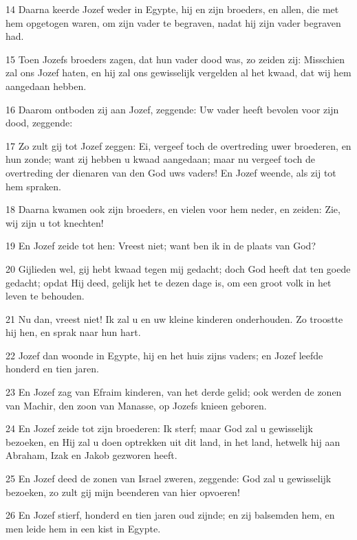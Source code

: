 \par 14 Daarna keerde Jozef weder in Egypte, hij en zijn broeders, en allen, die met hem opgetogen waren, om zijn vader te begraven, nadat hij zijn vader begraven had.
\par 15 Toen Jozefs broeders zagen, dat hun vader dood was, zo zeiden zij: Misschien zal ons Jozef haten, en hij zal ons gewisselijk vergelden al het kwaad, dat wij hem aangedaan hebben.
\par 16 Daarom ontboden zij aan Jozef, zeggende: Uw vader heeft bevolen voor zijn dood, zeggende:
\par 17 Zo zult gij tot Jozef zeggen: Ei, vergeef toch de overtreding uwer broederen, en hun zonde; want zij hebben u kwaad aangedaan; maar nu vergeef toch de overtreding der dienaren van den God uws vaders! En Jozef weende, als zij tot hem spraken.
\par 18 Daarna kwamen ook zijn broeders, en vielen voor hem neder, en zeiden: Zie, wij zijn u tot knechten!
\par 19 En Jozef zeide tot hen: Vreest niet; want ben ik in de plaats van God?
\par 20 Gijlieden wel, gij hebt kwaad tegen mij gedacht; doch God heeft dat ten goede gedacht; opdat Hij deed, gelijk het te dezen dage is, om een groot volk in het leven te behouden.
\par 21 Nu dan, vreest niet! Ik zal u en uw kleine kinderen onderhouden. Zo troostte hij hen, en sprak naar hun hart.
\par 22 Jozef dan woonde in Egypte, hij en het huis zijns vaders; en Jozef leefde honderd en tien jaren.
\par 23 En Jozef zag van Efraim kinderen, van het derde gelid; ook werden de zonen van Machir, den zoon van Manasse, op Jozefs knieen geboren.
\par 24 En Jozef zeide tot zijn broederen: Ik sterf; maar God zal u gewisselijk bezoeken, en Hij zal u doen optrekken uit dit land, in het land, hetwelk hij aan Abraham, Izak en Jakob gezworen heeft.
\par 25 En Jozef deed de zonen van Israel zweren, zeggende: God zal u gewisselijk bezoeken, zo zult gij mijn beenderen van hier opvoeren!
\par 26 En Jozef stierf, honderd en tien jaren oud zijnde; en zij balsemden hem, en men leide hem in een kist in Egypte.




